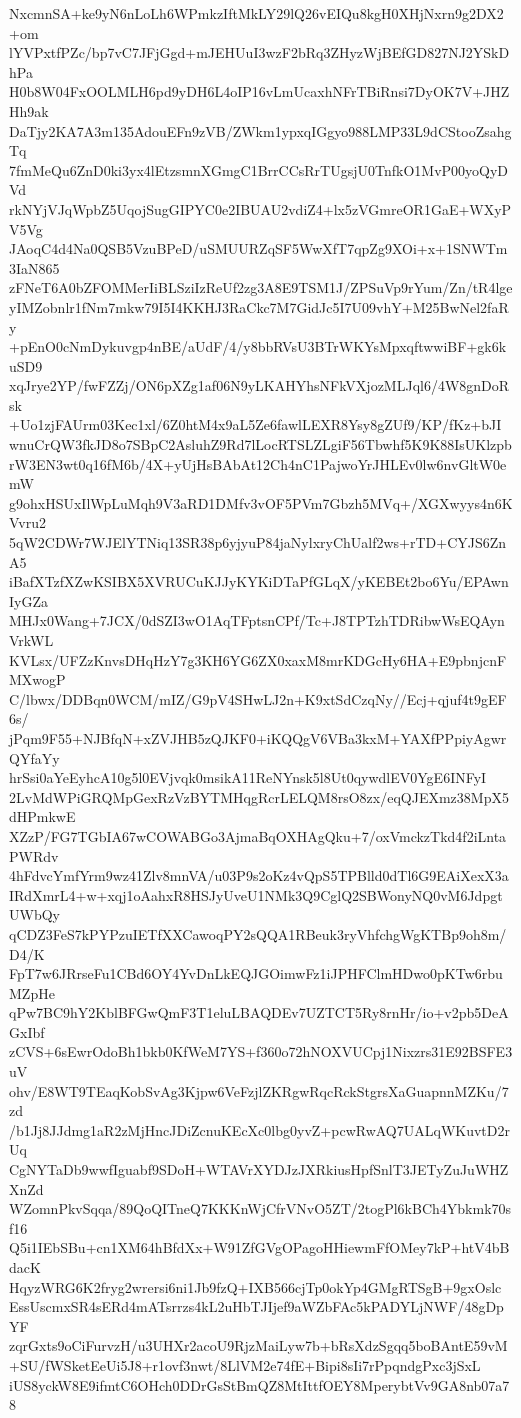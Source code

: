 NxcmnSA+ke9yN6nLoLh6WPmkzIftMkLY29lQ26vEIQu8kgH0XHjNxrn9g2DX2+om
lYVPxtfPZc/bp7vC7JFjGgd+mJEHUuI3wzF2bRq3ZHyzWjBEfGD827NJ2YSkDhPa
H0b8W04FxOOLMLH6pd9yDH6L4oIP16vLmUcaxhNFrTBiRnsi7DyOK7V+JHZHh9ak
DaTjy2KA7A3m135AdouEFn9zVB/ZWkm1ypxqIGgyo988LMP33L9dCStooZsahgTq
7fmMeQu6ZnD0ki3yx4lEtzsmnXGmgC1BrrCCsRrTUgsjU0TnfkO1MvP00yoQyDVd
rkNYjVJqWpbZ5UqojSugGIPYC0e2IBUAU2vdiZ4+lx5zVGmreOR1GaE+WXyPV5Vg
JAoqC4d4Na0QSB5VzuBPeD/uSMUURZqSF5WwXfT7qpZg9XOi+x+1SNWTm3IaN865
zFNeT6A0bZFOMMerIiBLSziIzReUf2zg3A8E9TSM1J/ZPSuVp9rYum/Zn/tR4lge
yIMZobnlr1fNm7mkw79I5I4KKHJ3RaCkc7M7GidJc5I7U09vhY+M25BwNel2faRy
+pEnO0cNmDykuvgp4nBE/aUdF/4/y8bbRVsU3BTrWKYsMpxqftwwiBF+gk6kuSD9
xqJrye2YP/fwFZZj/ON6pXZg1af06N9yLKAHYhsNFkVXjozMLJql6/4W8gnDoRsk
+Uo1zjFAUrm03Kec1xl/6Z0htM4x9aL5Ze6fawlLEXR8Ysy8gZUf9/KP/fKz+bJI
wnuCrQW3fkJD8o7SBpC2AsluhZ9Rd7lLocRTSLZLgiF56Tbwhf5K9K88IsUKlzpb
rW3EN3wt0q16fM6b/4X+yUjHsBAbAt12Ch4nC1PajwoYrJHLEv0lw6nvGltW0emW
g9ohxHSUxIlWpLuMqh9V3aRD1DMfv3vOF5PVm7Gbzh5MVq+/XGXwyys4n6KVvru2
5qW2CDWr7WJElYTNiq13SR38p6yjyuP84jaNylxryChUalf2ws+rTD+CYJS6ZnA5
iBafXTzfXZwKSIBX5XVRUCuKJJyKYKiDTaPfGLqX/yKEBEt2bo6Yu/EPAwnIyGZa
MHJx0Wang+7JCX/0dSZI3wO1AqTFptsnCPf/Tc+J8TPTzhTDRibwWsEQAynVrkWL
KVLsx/UFZzKnvsDHqHzY7g3KH6YG6ZX0xaxM8mrKDGcHy6HA+E9pbnjcnFMXwogP
C/lbwx/DDBqn0WCM/mIZ/G9pV4SHwLJ2n+K9xtSdCzqNy//Ecj+qjuf4t9gEF6s/
jPqm9F55+NJBfqN+xZVJHB5zQJKF0+iKQQgV6VBa3kxM+YAXfPPpiyAgwrQYfaYy
hrSsi0aYeEyhcA10g5l0EVjvqk0msikA11ReNYnsk5l8Ut0qywdlEV0YgE6INFyI
2LvMdWPiGRQMpGexRzVzBYTMHqgRcrLELQM8rsO8zx/eqQJEXmz38MpX5dHPmkwE
XZzP/FG7TGbIA67wCOWABGo3AjmaBqOXHAgQku+7/oxVmckzTkd4f2iLntaPWRdv
4hFdvcYmfYrm9wz41Zlv8mnVA/u03P9s2oKz4vQpS5TPBlld0dTl6G9EAiXexX3a
IRdXmrL4+w+xqj1oAahxR8HSJyUveU1NMk3Q9CglQ2SBWonyNQ0vM6JdpgtUWbQy
qCDZ3FeS7kPYPzuIETfXXCawoqPY2sQQA1RBeuk3ryVhfchgWgKTBp9oh8m/D4/K
FpT7w6JRrseFu1CBd6OY4YvDnLkEQJGOimwFz1iJPHFClmHDwo0pKTw6rbuMZpHe
qPw7BC9hY2KblBFGwQmF3T1eluLBAQDEv7UZTCT5Ry8rnHr/io+v2pb5DeAGxIbf
zCVS+6sEwrOdoBh1bkb0KfWeM7YS+f360o72hNOXVUCpj1Nixzrs31E92BSFE3uV
ohv/E8WT9TEaqKobSvAg3Kjpw6VeFzjlZKRgwRqcRckStgrsXaGuapnnMZKu/7zd
/b1Jj8JJdmg1aR2zMjHncJDiZcnuKEcXc0lbg0yvZ+pcwRwAQ7UALqWKuvtD2rUq
CgNYTaDb9wwfIguabf9SDoH+WTAVrXYDJzJXRkiusHpfSnlT3JETyZuJuWHZXnZd
WZomnPkvSqqa/89QoQITneQ7KKKnWjCfrVNvO5ZT/2togPl6kBCh4Ybkmk70sf16
Q5i1IEbSBu+cn1XM64hBfdXx+W91ZfGVgOPagoHHiewmFfOMey7kP+htV4bBdacK
HqyzWRG6K2fryg2wrersi6ni1Jb9fzQ+IXB566cjTp0okYp4GMgRTSgB+9gxOslc
EssUscmxSR4sERd4mATsrrzs4kL2uHbTJIjef9aWZbFAc5kPADYLjNWF/48gDpYF
zqrGxts9oCiFurvzH/u3UHXr2acoU9RjzMaiLyw7b+bRsXdzSgqq5boBAntE59vM
+SU/fWSketEeUi5J8+r1ovf3nwt/8LlVM2e74fE+Bipi8sIi7rPpqndgPxc3jSxL
iUS8yckW8E9ifmtC6OHch0DDrGsStBmQZ8MtIttfOEY8MperybtVv9GA8nb07a78
